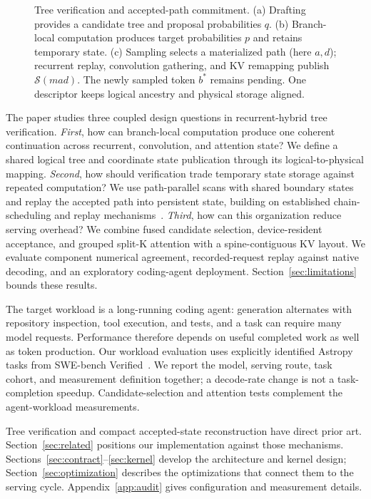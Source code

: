 \documentclass[conference]{IEEEtran}
\begin{document}
\begin{figure}[t]
\centering
\resizebox{\textwidth}{!}{}
\caption{Tree verification and accepted-path commitment. (a) Drafting provides a candidate tree and proposal probabilities $q$. (b) Branch-local computation produces target probabilities $p$ and retains temporary state. (c) Sampling selects a materialized path (here $a,d$); recurrent replay, convolution gathering, and KV remapping publish $\mathcal{S}(mad)$. The newly sampled token $b^*$ remains pending. One descriptor keeps logical ancestry and physical storage aligned.}
\label{fig:pipeline}
\end{figure}

The paper studies three coupled design questions in recurrent-hybrid tree verification. \textit{First}, how can branch-local computation produce one coherent continuation across recurrent, convolution, and attention state? We define a shared logical tree and coordinate state publication through its logical-to-physical mapping. \textit{Second}, how should verification trade temporary state storage against repeated computation? We use path-parallel scans with shared boundary states and replay the accepted path into persistent state, building on established chain-scheduling and replay mechanisms~\cite{wang2026specla,oda2026marginals}. \textit{Third}, how can this organization reduce serving overhead? We combine fused candidate selection, device-resident acceptance, and grouped split-K attention with a spine-contiguous KV layout. We evaluate component numerical agreement, recorded-request replay against native decoding, and an exploratory coding-agent deployment. Section~\ref{sec:limitations} bounds these results.

The target workload is a long-running coding agent: generation alternates with repository inspection, tool execution, and tests, and a task can require many model requests. Performance therefore depends on useful completed work as well as token production. Our workload evaluation uses explicitly identified Astropy tasks from SWE-bench Verified~\cite{jimenez2024swe}. We report the model, serving route, task cohort, and measurement definition together; a decode-rate change is not a task-completion speedup. Candidate-selection and attention tests complement the agent-workload measurements.

Tree verification and compact accepted-state reconstruction have direct prior art. Section~\ref{sec:related} positions our implementation against those mechanisms. Sections~\ref{sec:contract}--\ref{sec:kernel} develop the architecture and kernel design; Section~\ref{sec:optimization} describes the optimizations that connect them to the serving cycle. Appendix~\ref{app:audit} gives configuration and measurement details.
\end{document}
